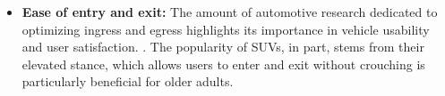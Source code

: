 \begin{itemize}
    \item \textbf{Ease of entry and exit:} The amount of automotive research dedicated to optimizing ingress and egress highlights its importance in vehicle usability and user satisfaction. \cite{roof_height_ingress} \cite{giacomin_analysis_1997} \cite{causse_dynamic_2009}. The popularity of SUVs, in part, stems from their elevated stance, which allows users to enter and exit without crouching is particularly beneficial for older adults.

\end{itemize}

